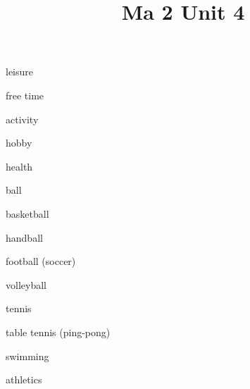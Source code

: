 \documentclass[avery5371,grid,frame]{flashcards}
\title{Ma 2 Unit 4}
\begin{document}
\begin{flashcard}{\LARGE leisure}
\LARGE {}
\end{flashcard}
\begin{flashcard}{\LARGE free time}
\LARGE {}
\end{flashcard}
\begin{flashcard}{\LARGE activity}
\LARGE {}
\end{flashcard}
\begin{flashcard}{\LARGE hobby}
\LARGE {}
\end{flashcard}
\begin{flashcard}{\LARGE health}
\LARGE {}
\end{flashcard}
\begin{flashcard}{\LARGE ball}
\LARGE {}
\end{flashcard}
\begin{flashcard}{\LARGE basketball}
\LARGE {}
\end{flashcard}
\begin{flashcard}{\LARGE handball}
\LARGE {}
\end{flashcard}
\begin{flashcard}{\LARGE football (soccer)}
\LARGE {}
\end{flashcard}
\begin{flashcard}{\LARGE volleyball}
\LARGE {}
\end{flashcard}
\begin{flashcard}{\LARGE tennis}
\LARGE {}
\end{flashcard}
\begin{flashcard}{\LARGE table tennis (ping-pong)}
\LARGE {}
\end{flashcard}
\begin{flashcard}{\LARGE swimming}
\LARGE {}
\end{flashcard}
\begin{flashcard}{\LARGE athletics}
\LARGE {}
\end{flashcard}
\end{document}
